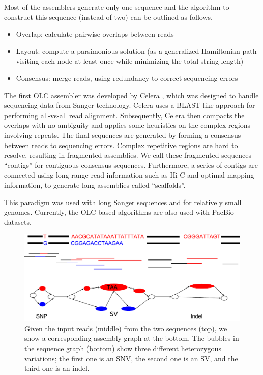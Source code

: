 Most of the assemblers generate only one sequence and the algorithm to construct this sequence (instead of two) can be outlined as follows.
\begin{itemize}
 \item Overlap: calculate pairwise overlaps between reads
 \item  Layout: compute a parsimonious solution (as a generalized Hamiltonian path visiting each node at least once while minimizing the total string length)
 \item  Consensus: merge reads, using redundancy to correct sequencing errors
\end{itemize}

The first OLC assembler was developed by Celera \citep{myers2000whole}, which was designed to handle sequencing data from Sanger technology.
Celera uses a BLAST-like approach for performing all-vs-all read alignment. 
Subsequently, Celera then compacts the overlaps with no ambiguity and applies some heuristics on the complex regions involving repeats. The final sequences
are generated by forming a consensus between reads to sequencing errors. Complex repetitive regions are hard to resolve, resulting in fragmented assemblies.  We call these fragmented sequences
``contigs'' for contiguous consensus sequences. Furthermore, a series of contigs are connected using long-range read information such as Hi-C and optimal mapping information, to generate long assemblies called ``scaffolds''.

This paradigm was used with long Sanger sequences and for relatively small
genomes. Currently, the OLC-based algorithms are also used with PacBio datasets. 
\bigskip

\begin{figure}[t!]\centering
\includegraphics[width=\columnwidth]{ex_sv.pdf}
\caption{Given the input reads (middle) from the two sequences (top), we show a corresponding assembly graph at the bottom.
The bubbles in the sequence graph (bottom) show three different heterozygous variations; the first one is an SNV, the second one is an SV, and the third one is an indel. }
\label{fig:ex_sv}
\end{figure}

